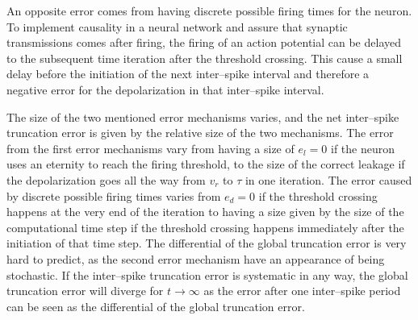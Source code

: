 	An opposite error comes from having discrete possible firing times for the neuron.
	To implement causality in a neural network and assure that synaptic transmissions comes after firing, the firing of an action potential can be delayed to the subsequent time iteration after the threshold crossing.
	This cause a small delay before the initiation of the next inter--spike interval and therefore a negative error for the depolarization in that inter--spike interval. 

	The size of the two mentioned error mechanisms varies, and the net inter--spike truncation error is given by the relative size of the two mechanisms.
	The error from the first error mechanisms vary from having a size of $e_l=0$ if the neuron uses an eternity to reach the firing threshold,
		 to the size of the correct leakage if the depolarization goes all the way from $v_r$ to $\tau$ in one iteration.
	The error caused by discrete possible firing times varies from $e_d=0$ if the threshold crossing happens at the very end of the iteration to 
		having a size given by the size of the computational time step if the threshold crossing happens immediately after the initiation of that time step.
	The differential of the global truncation error is very hard to predict, as the second error mechanism have an appearance of being stochastic.
	If the inter--spike truncation error is systematic in any way, the global truncation error will diverge for $t\to\infty$ as the error after one inter--spike period can be seen as the differential of the global truncation error.
	



















	

